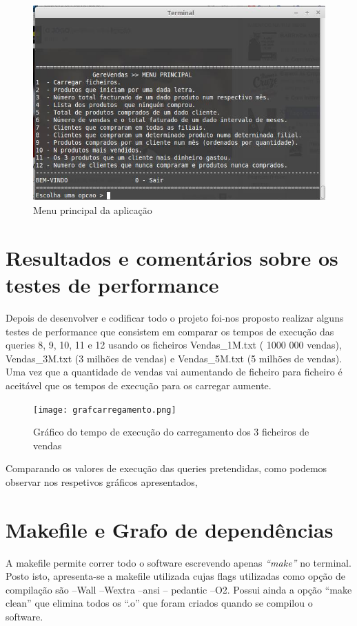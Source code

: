 \begin{figure}[h!]
	\centering
	\includegraphics[scale=0.6]{menu.png}  
	\caption{Menu principal da aplicação}  
\end{figure}



\chapter{Resultados e comentários sobre os testes de performance}
Depois de desenvolver e codificar todo o projeto foi-nos proposto realizar alguns testes de performance que consistem em comparar os tempos de execução das queries 8, 9, 10, 11 e 12 usando os ficheiros Vendas\_1M.txt ( 1000 000 vendas), Vendas\_3M.txt (3 milhões de vendas) e Vendas\_5M.txt (5 milhões de vendas).
Uma vez que a quantidade de vendas vai aumentando de ficheiro para ficheiro é aceitável que os tempos de execução para os carregar aumente.


\begin{figure}[h!]
	\centering
	\texttt{[image: grafcarregamento.png]}  
	\caption{Gráfico do tempo de execução do carregamento dos 3 ficheiros de vendas}  
\end{figure}

Comparando os valores de execução das queries pretendidas, como podemos observar nos respetivos gráficos apresentados,




\chapter{Makefile e Grafo de dependências}
A makefile permite correr todo o software escrevendo apenas \textit{“make”} no terminal. Posto isto, apresenta-se a makefile utilizada cujas flags utilizadas como opção de compilação são –Wall –Wextra –ansi – pedantic –O2.
Possui ainda a opção “make clean” que elimina todos os “.o” que foram criados quando se compilou o software.

